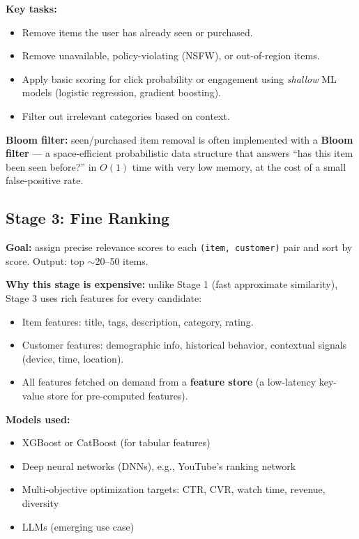 \documentclass[11pt]{article}
\begin{document}
\textbf{Key tasks:}
\begin{itemize}
    \item Remove items the user has already seen or purchased.
    \item Remove unavailable, policy-violating (NSFW), or out-of-region
      items.
    \item Apply basic scoring for click probability or engagement using
      \emph{shallow} ML models (logistic regression, gradient boosting).
    \item Filter out irrelevant categories based on context.
\end{itemize}

\textbf{Bloom filter:} seen/purchased item removal is often implemented
with a \textbf{Bloom filter} --- a space-efficient probabilistic data
structure that answers ``has this item been seen before?'' in $O(1)$
time with very low memory, at the cost of a small false-positive rate.

\subsection{Stage 3: Fine Ranking}
\textbf{Goal:} assign precise relevance scores to each
\texttt{(item, customer)} pair and sort by score. Output: top $\sim$20--50
items.

\textbf{Why this stage is expensive:} unlike Stage 1 (fast approximate
similarity), Stage 3 uses rich features for every candidate:
\begin{itemize}
    \item Item features: title, tags, description, category, rating.
    \item Customer features: demographic info, historical behavior,
      contextual signals (device, time, location).
    \item All features fetched on demand from a \textbf{feature store}
      (a low-latency key-value store for pre-computed features).
\end{itemize}

\textbf{Models used:}
\begin{itemize}
    \item XGBoost or CatBoost (for tabular features)
    \item Deep neural networks (DNNs), e.g., YouTube's ranking network
    \item Multi-objective optimization targets: CTR, CVR, watch time,
      revenue, diversity
    \item LLMs (emerging use case)
\end{itemize}
\end{document}
